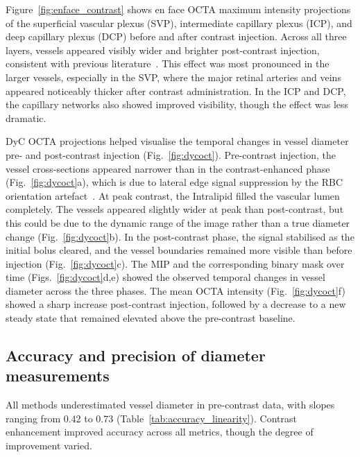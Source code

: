 \documentclass{optica-article}
\begin{document}
Figure~\ref{fig:enface_contrast} shows en face OCTA maximum intensity projections of the superficial vascular plexus (SVP), intermediate capillary plexus (ICP), and deep capillary plexus (DCP) before and after contrast injection. Across all three layers, vessels appeared visibly wider and brighter post-contrast injection, consistent with previous literature~\cite{merkleHighresolutionDepthresolvedVascular2021}. This effect was most pronounced in the larger vessels, especially in the SVP, where the major retinal arteries and veins appeared noticeably thicker after contrast administration. In the ICP and DCP, the capillary networks also showed improved visibility, though the effect was less dramatic.

DyC OCTA projections helped visualise the temporal changes in vessel diameter pre- and post-contrast injection (Fig.~\ref{fig:dycoct}). Pre-contrast injection, the vessel cross-sections appeared narrower than in the contrast-enhanced phase (Fig.~\ref{fig:dycoct}a), which is due to lateral edge signal suppression by the RBC orientation artefact~\cite{bernucciInvestigationArtifactsRetinal2018}. At peak contrast, the Intralipid filled the vascular lumen completely. The vessels appeared slightly wider at peak than post-contrast, but this could be due to the dynamic range of the image rather than a true diameter change (Fig.~\ref{fig:dycoct}b). In the post-contrast phase, the signal stabilised as the initial bolus cleared, and the vessel boundaries remained more visible than before injection (Fig.~\ref{fig:dycoct}c). The MIP and the corresponding binary mask over time (Figs.~\ref{fig:dycoct}d,e) showed the observed temporal changes in vessel diameter across the three phases. The mean OCTA intensity (Fig.~\ref{fig:dycoct}f) showed a sharp increase post-contrast injection, followed by a decrease to a new steady state that remained elevated above the pre-contrast baseline. 

\subsection{Accuracy and precision of diameter measurements}
\label{subsec:accuracy_precision}
All methods underestimated vessel diameter in pre-contrast data, with slopes ranging from 0.42 to 0.73 (Table~\ref{tab:accuracy_linearity}). Contrast enhancement improved accuracy across all metrics, though the degree of improvement varied. 
\end{document}
